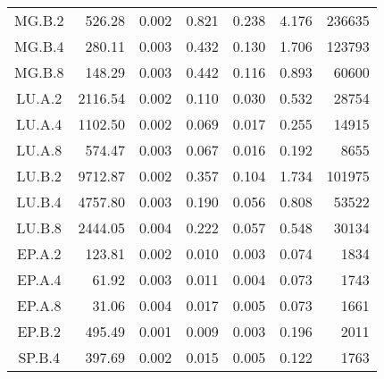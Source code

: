 \begin{ThreePartTable}
\begin{longtable}[c]{c*{6}{r}}
    MG.B.2                 & 526.28                              & 0.002                               & 0.821          & 0.238 & 4.176 & 236635 \\
    MG.B.4                 & 280.11                              & 0.003                               & 0.432          & 0.130 & 1.706 & 123793 \\
    MG.B.8                 & 148.29                              & 0.003                               & 0.442          & 0.116 & 0.893 & 60600  \\
    LU.A.2                 & 2116.54                             & 0.002                               & 0.110          & 0.030 & 0.532 & 28754  \\
    LU.A.4                 & 1102.50                             & 0.002                               & 0.069          & 0.017 & 0.255 & 14915  \\
    LU.A.8                 & 574.47                              & 0.003                               & 0.067          & 0.016 & 0.192 & 8655   \\
    LU.B.2                 & 9712.87                             & 0.002                               & 0.357          & 0.104 & 1.734 & 101975 \\
    LU.B.4                 & 4757.80                             & 0.003                               & 0.190          & 0.056 & 0.808 & 53522  \\
    LU.B.8                 & 2444.05                             & 0.004                               & 0.222          & 0.057 & 0.548 & 30134  \\
    EP.A.2                 & 123.81                              & 0.002                               & 0.010          & 0.003 & 0.074 & 1834   \\
    EP.A.4                 & 61.92                               & 0.003                               & 0.011          & 0.004 & 0.073 & 1743   \\
    EP.A.8                 & 31.06                               & 0.004                               & 0.017          & 0.005 & 0.073 & 1661   \\
    EP.B.2                 & 495.49                              & 0.001                               & 0.009          & 0.003 & 0.196 & 2011   \\
    SP.B.4                 & 397.69                              & 0.002                               & 0.015          & 0.005 & 0.122 & 1763   \\

\end{longtable}
\end{ThreePartTable}
